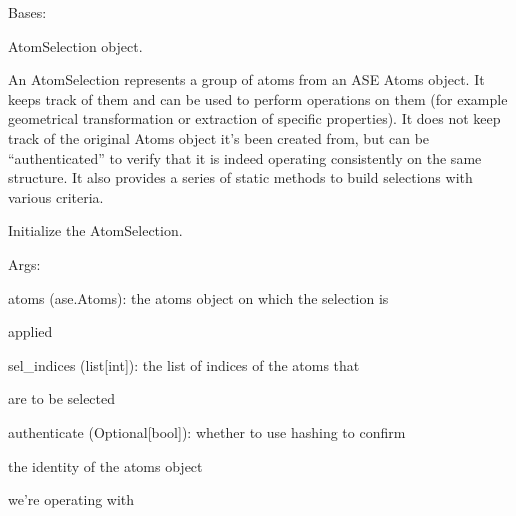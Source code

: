 \documentclass[letterpaper,10pt,english]{sphinxmanual}
\begin{document}
\begin{fulllineitems}
\label{doctree/soprano.selection:soprano.selection.AtomSelection}
Bases: 

AtomSelection object.

An AtomSelection represents a group of atoms from an ASE Atoms object.
It keeps track of them and can be used to perform operations on them
(for example geometrical transformation or extraction of specific
properties).
It does not keep track of the original Atoms object it's been created
from, but can be ``authenticated'' to verify that it is indeed operating
consistently on the same structure. It also provides a series of static
methods to build selections with various criteria.

Initialize the AtomSelection.

\begin{DUlineblock}{0em}
\item[] Args:
\item[]
\begin{DUlineblock}{\DUlineblockindent}
\item[] atoms (ase.Atoms): the atoms object on which the selection is
\item[]
\begin{DUlineblock}{\DUlineblockindent}
\item[] applied
\end{DUlineblock}
\item[] sel\_indices (list{[}int{]}): the list of indices of the atoms that
\item[]
\begin{DUlineblock}{\DUlineblockindent}
\item[] are to be selected
\end{DUlineblock}
\item[] authenticate (Optional{[}bool{]}): whether to use hashing to confirm
\item[]
\begin{DUlineblock}{\DUlineblockindent}
\item[] the identity of the atoms object
\item[] we're operating with
\end{DUlineblock}
\end{DUlineblock}
\end{DUlineblock}


\end{fulllineitems}
\end{document}

